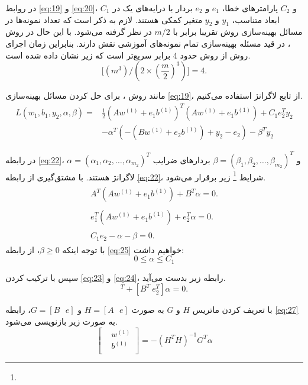 \bigbreak
در روابط \ref{eq:19} و \ref{eq:20}،  $C_1$ و $C_2$  پارامترهای خطا،  $e_1$ و  $e_2$ بردار با درایه‌های یک در ابعاد متناسب،  $y_1$ و $y_2$  متغیر کمکی هستند. لازم به ذکر است که تعداد نمونه‌ها در مسائل بهینه‌سازی روش  تقریبا برابر با $m/2$ در نظر گرفته می‌شود. با این حال در روش ، در قید مسئله بهینه‌سازی تمام نمونه‌های آموزشی نقش دارند. بنابراین زمان اجرای روش  از روش  حدود 4 برابر سریع‌تر است که زیر نشان داده شده است.
\begin{equation}
\Big[({{m}^{3}})/(2\times {{(\frac{m}{2})}^{3}})\Big] = 4.
\label{eq:21}
\end{equation}

مانند روش ، برای حل کردن مسائل بهینه‌سازی \ref{eq:19}، از تابع لاگرانژ استفاده می‌کنیم.
\begin{equation}
\begin{split}
L(w_{1},b_{1},y_{2}, \alpha, \beta )= &\frac{1}{2}(A{{w}^{(1)}}+{{e}_{1}}{{b}^{(1)}})^{T}(A{{w}^{(1)}}+{{e}_{1}}{{b}^{(1)}}) + {{C}_{1}}e_{2}^{T}y_{2} \\
&-\alpha^{T}(-(Bw^{(1)}+e_{2}b^{(1)})+y_{2} - e_{2}) - \beta^{T}y_{2}
\end{split}
\label{eq:22}
\end{equation}

در رابطه \ref{eq:22}، $\alpha=(\alpha_{1}, \alpha_{2}, \dots,\alpha_{m_{2}})^{T}$ و $\beta=(\beta_{1}, \beta_{2}, \dots,\beta_{m_{2}})^{T}$ بردارهای ضرایب لاگرانژ هستند.  با مشتق‌گیری از رابطه \ref{eq:22}، شرایط \footnote{}  زیر برقرار می‌شود.
\begin{align}
\label{eq:23}
\begin{split}
A^{T}(A{{w}^{(1)}}+{{e}_{1}}{{b}^{(1)}}) + B^{T}\alpha = 0.
\end{split} \\
\label{eq:24}
\begin{split}
e_{1}^{T}(A{{w}^{(1)}}+{{e}_{1}}{{b}^{(1)}}) + e_{2}^{T}\alpha = 0.
\end{split}\\
\label{eq:25}
\begin{split}
C_{1}e_{2} - \alpha - \beta = 0.
\end{split} 
\end{align}
با توجه اینکه $\beta \ge 0$، از رابطه \ref{eq:25} خواهیم داشت:
\begin{equation}
0 \le \alpha \le {C}_{1}
\label{eq:26}
\end{equation}

سپس با ترکیب کردن \ref{eq:23} و \ref{eq:24}، رابطه زیر بدست می‌آید.
\begin{equation}
[A^{T}\ e^{T}_{1}][A\ e_{1}][w^{(1)}\ b^{(1)}]^{T} + [B^{T}\ e^{T}_{2}]\alpha = 0.
\label{eq:27}
\end{equation}

با تعریف کردن ماتریس $H$ و $G$ به صورت $H=[A\text{ }e]$ و $G=[B\text{ }e]$، رابطه \ref{eq:27} به صورت زیر بازنویسی می‌شود.
\begin{equation}
\left[ \begin{aligned}
& {{w}^{(1)}} \\
& {{b}^{(1)}} \\
\end{aligned} \right]= -{{({{H}^{T}}H)}^{-1}}{{G}^{T}}\alpha
\end{equation}
